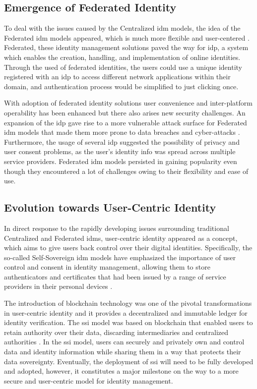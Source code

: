 \subsection{Emergence of Federated Identity}

To deal with the issues caused by the Centralized \gls{idm} models, the idea of the Federated \gls{idm} models appeared, which is much more flexible and user-centered 
\cite{9695553}. Federated, these identity management solutions paved the way for \gls{idp}, a system which enables the creation, handling, and implementation of online 
identities. Through the used of federated identities, the users could use a unique identity registered with an \gls{idp} to access different network applications within their
domain, and authentication process would be simplified to just clicking once.

With adoption of federated identity solutions user convenience and inter-platform operability has been enhanced but there also arises new security challenges. An expansion
of the \gls{idp} gave rise to a more vulnerable attack surface for Federated \gls{idm} models that made them more prone to data breaches and cyber-attacks \cite{9695553}. 
Furthermore, the usage of several \gls{idp} suggested the possibility of privacy and user consent problems, as the user’s identity info was spread across multiple 
service providers. Federated \gls{idm} models persisted in gaining popularity even though they encountered a lot of challenges owing to their flexibility and ease of use.

\subsection{Evolution towards User-Centric Identity}

In direct response to the rapidly developing issues surrounding traditional Centralized and Federated \gls{idm}s, user-centric identity appeared as a concept, which 
aims to give users back control over their digital identities. Specifically, the so-called Self-Sovereign \gls{idm} models have emphasized the importance of user 
control and consent in identity management, allowing them to store authenticators and certificates that had been issued by a range of service providers in their personal 
devices \cite{9881610}.

The introduction of blockchain technology was one of the pivotal transformations in user-centric identity and it provides a decentralized and immutable ledger for identity 
verification. The \gls{ssi} model was based on blockchain that enabled users to retain authority over their data, discarding intermediaries and centralized authorities 
\cite{9881610}. In the \gls{ssi} model, users can securely and privately own and control data and identity information while sharing them in a way that protects 
their data sovereignty. Eventually, the deployment of \gls{ssi} will need to be fully developed and adopted, however, it constitutes a major milestone on the way to a more 
secure and user-centric model for identity management.
